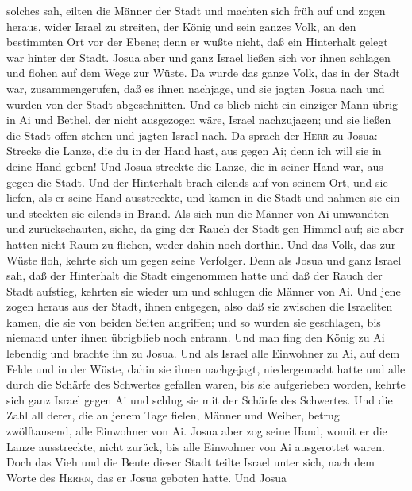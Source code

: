 solches sah, eilten die Männer der Stadt und machten sich früh auf und
zogen heraus, wider Israel zu streiten, der König und sein ganzes Volk,
an den bestimmten Ort vor der Ebene; denn er wußte nicht, daß ein
Hinterhalt gelegt war hinter der Stadt.  Josua aber und
ganz Israel ließen sich vor ihnen schlagen und flohen auf dem Wege zur
Wüste.  Da wurde das ganze Volk, das in der Stadt war,
zusammengerufen, daß es ihnen nachjage, und sie jagten Josua nach und
wurden von der Stadt abgeschnitten.  Und es blieb nicht
ein einziger Mann übrig in Ai und Bethel, der nicht ausgezogen wäre,
Israel nachzujagen; und sie ließen die Stadt offen stehen und jagten
Israel nach.  Da sprach der \textsc{Herr} zu Josua:
Strecke die Lanze, die du in der Hand hast, aus gegen Ai; denn ich will
sie in deine Hand geben! Und Josua streckte die Lanze, die in seiner
Hand war, aus gegen die Stadt.  Und der Hinterhalt brach
eilends auf von seinem Ort, und sie liefen, als er seine Hand
ausstreckte, und kamen in die Stadt und nahmen sie ein und steckten sie
eilends in Brand.  Als sich nun die Männer von Ai
umwandten und zurückschauten, siehe, da ging der Rauch der Stadt gen
Himmel auf; sie aber hatten nicht Raum zu fliehen, weder dahin noch
dorthin. Und das Volk, das zur Wüste floh, kehrte sich um gegen seine
Verfolger.  Denn als Josua und ganz Israel sah, daß der
Hinterhalt die Stadt eingenommen hatte und daß der Rauch der Stadt
aufstieg, kehrten sie wieder um und schlugen die Männer von Ai.
 Und jene zogen heraus aus der Stadt, ihnen entgegen,
also daß sie zwischen die Israeliten kamen, die sie von beiden Seiten
angriffen; und so wurden sie geschlagen, bis niemand unter ihnen
übrigblieb noch entrann.  Und man fing den König zu Ai
lebendig und brachte ihn zu Josua.  Und als Israel alle
Einwohner zu Ai, auf dem Felde und in der Wüste, dahin sie ihnen
nachgejagt, niedergemacht hatte und alle durch die Schärfe des Schwertes
gefallen waren, bis sie aufgerieben worden, kehrte sich ganz Israel
gegen Ai und schlug sie mit der Schärfe des Schwertes. 
Und die Zahl all derer, die an jenem Tage fielen, Männer und Weiber,
betrug zwölftausend, alle Einwohner von Ai.  Josua aber
zog seine Hand, womit er die Lanze ausstreckte, nicht zurück, bis alle
Einwohner von Ai ausgerottet waren.  Doch das Vieh und
die Beute dieser Stadt teilte Israel unter sich, nach dem Worte des
\textsc{Herrn}, das er Josua geboten hatte.  Und Josua
